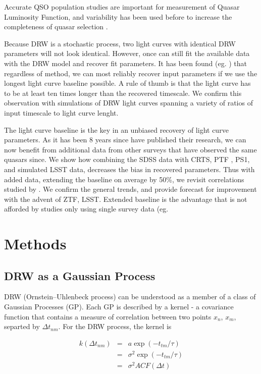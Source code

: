 \documentclass[twocolumn]{aastex62}
\begin{document}
Accurate QSO population studies are important for measurement of Quasar Luminosity Function, and variability has been used before to increase the completeness of quasar selection  \citep{ ross2013, palanque2013, alsayyad2016, mcgreer2013, mcgreer2018}. 


Because DRW is a stochastic process, two light curves with identical DRW parameters will not look identical. However, once can still fit the available data with the DRW model and recover fit parameters. It has been found (eg. \citet{macleod2011, kozlowski2010, kozlowski2017a}) that regardless of method,  we can most reliably recover input parameters if we use the longest light curve baseline possible. A rule of thumb is that the light curve has to be at least  ten  times longer than the recovered timescale.  We confirm this observation with simulations of DRW light curves spanning a variety of ratios of input timescale to light curve lenght.  

The light curve baseline is the key in an unbiased recovery of light curve parameters. As it has been  8 years since \citet{macleod2010} have published their research,   we can now benefit from additional data from other surveys that have observed the same quasars since. We show how combining the SDSS data with CRTS, PTF , PS1,  and simulated LSST data, decreases the bias in recovered parameters.  Thus with added data, extending the baseline on average by 50\%,  we revisit correlations studied by \citet{macleod2010}.  We confirm the general trends, and provide forecast for improvement with the advent of ZTF, LSST. Extended baseline is the advantage that is not afforded by studies only using single survey data (eg. \citet{hernitschek2016}



\section{Methods}
\subsection{DRW as a Gaussian Process}
DRW (Ornstein–Uhlenbeck process) can be understood as a member of a class of Gaussian Processes (GP). Each GP is described by a kernel - a covariance function that contains a measure of correlation between two points $x_{n}$, $x_{m}$, separted by $\Delta t_{nm}$. For the  DRW process, the kernel is 

\begin{eqnarray}
k(\Delta t_{nm}) &=& a \exp{(-t_{tm} / \tau)} \\
                 &=& \sigma^{2}\exp{(-t_{tm} / \tau)}  \\
                 &=& \sigma^{2} ACF(\Delta t)
\end{eqnarray} 
\end{document}
